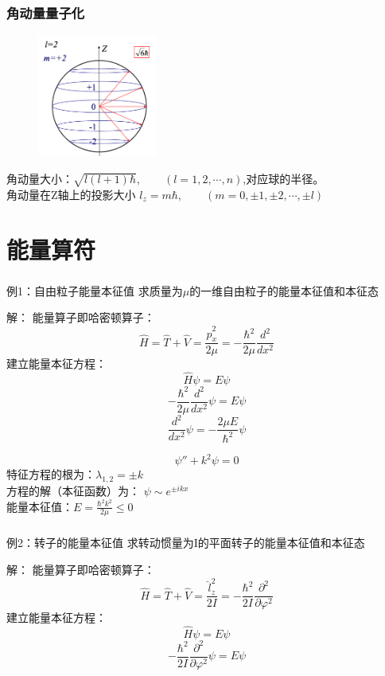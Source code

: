 \begin{frame} 
    \frametitle{角动量量子化}
    \begin{figure} %
        \includegraphics[width=0.35\textwidth]{figs/LandL2.png}   
    \end{figure}
    角动量大小：$\sqrt{l(l+1)\hbar}, \qquad (l=1,2,\cdots, n)$,对应球的半径。\\
    角动量在Z轴上的投影大小 $l_z=m\hbar, \qquad (m=0,\pm 1,\pm 2, \cdots, \pm l)$
\end{frame} 

\section{能量算符}

\begin{frame} 
    \frametitle{}
    
    \begin{tcolorbox2}{例1：自由粒子能量本征值}
    求质量为$\mu$的一维自由粒子的能量本征值和本征态  
    \end{tcolorbox2}
    \alert{解：} 能量算子即哈密顿算子：
    $$ \hat{H}=\hat{T}+\hat{V}=\frac{\hat{p}_x ^2 }{2\mu} = -\frac{\hbar^2}{2\mu}\frac{d^2}{dx^2} $$
    建立能量本征方程：
    $$ \hat{H} \psi =E \psi $$
    $$ -\frac{\hbar^2}{2\mu}\frac{d^2}{dx^2} \psi =E \psi $$
    $$ \frac{d^2}{dx^2} \psi = -\frac{2\mu E}{\hbar^2} \psi $$
\end{frame}

\begin{frame} 
    $$  \psi'' + k^2 \psi =0 $$
    特征方程的根为：$\lambda_{1,2}=\pm k$ \\
    方程的解（本征函数）为： $\psi \sim e^{\pm ikx}$  \\
    能量本征值：$ E= \frac{\hbar^2 k^2 }{2\mu} \le 0 $
\end{frame}


\begin{frame} 
    \frametitle{ }
    \begin{tcolorbox2}{例2：转子的能量本征值}
    求转动惯量为I的平面转子的能量本征值和本征态 
    \end{tcolorbox2}
    \alert{解：} 能量算子即哈密顿算子：
    $$ \hat{H}=\hat{T}+\hat{V}=\frac{\hat{l}_z ^2 }{2I} = -\frac{\hbar^2}{2I}\frac{\partial^2}{\partial\varphi^2} $$
    建立能量本征方程：
    $$ \hat{H} \psi =E \psi $$
    $$ -\frac{\hbar^2}{2I}\frac{\partial^2}{\partial\varphi^2} \psi =E \psi $$
\end{frame}

